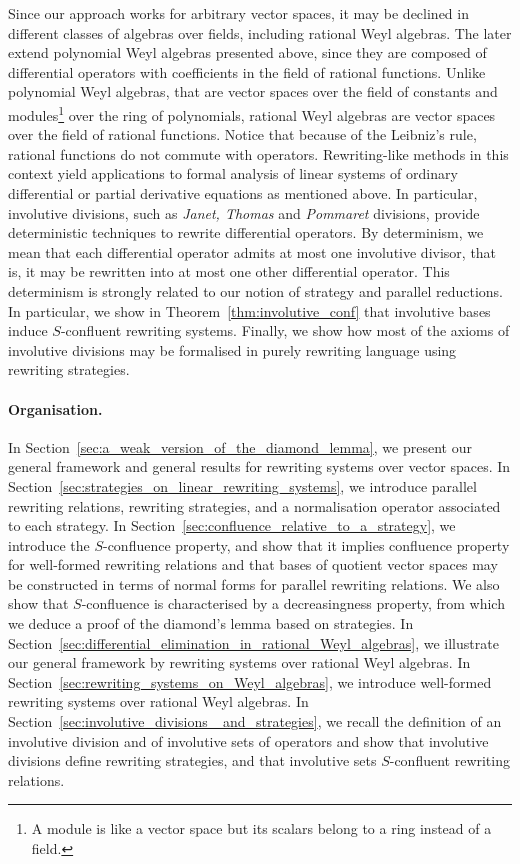 \documentclass[11pt]{article}
\theoremstyle{definition}
\begin{document}
Since our approach works for arbitrary vector spaces, it may be declined
in different classes of algebras over fields, including rational Weyl
algebras. The later extend polynomial Weyl algebras presented above,
since they are composed of differential operators with coefficients in
the field of rational functions. Unlike polynomial Weyl algebras, that
are vector spaces over the field of constants and modules\footnote{A
  module is like a vector space but its scalars belong to a ring instead
  of a field.} over the ring of polynomials, rational Weyl algebras are
vector spaces over the field of rational functions. Notice that because
of the Leibniz's rule, rational functions do not commute with operators.
Rewriting-like methods in this context yield applications to formal
analysis of linear systems of ordinary differential or partial derivative
equations as mentioned above. In particular, involutive divisions, such
as {\em Janet, Thomas} and {\em Pommaret} divisions, provide
deterministic techniques to rewrite differential operators. By
determinism, we mean that each differential operator admits at most one
involutive divisor, that is, it may be rewritten into at most one other
differential operator. This determinism is strongly related to our notion
of strategy and parallel reductions. In particular, we show in 
Theorem~\ref{thm:involutive_conf} that involutive bases induce
$S$-confluent rewriting systems. Finally, we show how most of the axioms
of involutive divisions may be formalised in purely rewriting language
using rewriting strategies.
\medskip

\paragraph{Organisation.}

In Section~\ref{sec:a_weak_version_of_the_diamond_lemma}, we present our
general framework and general results for rewriting systems over vector
spaces. In Section~\ref{sec:strategies_on_linear_rewriting_systems}, we
introduce parallel rewriting relations, rewriting strategies, and a
normalisation operator associated to each strategy. In
Section~\ref{sec:confluence_relative_to_a_strategy}, we introduce the
$S$-confluence property, and show that it implies confluence property for
well-formed rewriting relations and that bases of quotient vector spaces
may be constructed in terms of normal forms for parallel rewriting
relations. We also show that $S$-confluence is characterised by a
decreasingness property, from which we deduce a proof of the diamond's
lemma based on strategies. In
Section~\ref{sec:differential_elimination_in_rational_Weyl_algebras}, we
illustrate our general framework by rewriting systems over rational Weyl
algebras. In Section~\ref{sec:rewriting_systems_on_Weyl_algebras}, we
introduce well-formed rewriting systems over rational Weyl algebras. In
Section~\ref{sec:involutive_divisions_ and_strategies}, we recall the
definition of an involutive division and of involutive sets of operators
and show that involutive divisions define rewriting strategies, and that
involutive sets $S$-confluent rewriting relations.
\medskip
\end{document}
